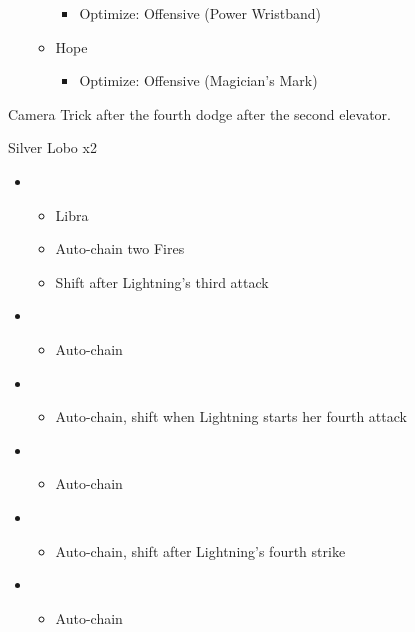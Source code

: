 \begin{multicols}{2}
\begin{menu}
\begin{itemize}
\begin{itemize}
	\begin{itemize}
		\item Optimize: Offensive (Power Wristband)
	\end{itemize}
        \item Hope
        \begin{itemize}
            \item Optimize: Offensive (Magician's Mark)
        \end{itemize}
    \end{itemize}
\end{itemize}
\end{menu}
Camera Trick after the fourth dodge after the second elevator.

\begin{battle}{Silver Lobo x2}
\begin{itemize}
    \item \first
    \begin{itemize}
        \item Libra
        \item Auto-chain two Fires
        \item Shift after Lightning's third attack
    \end{itemize}
    \item \fourth
    \begin{itemize}
        \item Auto-chain
    \end{itemize}
    \item \sixth
    \begin{itemize}
        \item Auto-chain, shift when Lightning starts her fourth attack
    \end{itemize}
    \item \first
    \begin{itemize}
        \item Auto-chain
    \end{itemize}
    \item \fourth
    \begin{itemize}
        \item Auto-chain, shift after Lightning's fourth strike
    \end{itemize}
    \item \sixth
    \begin{itemize}
        \item Auto-chain
    \end{itemize}
\end{itemize}
\end{battle}


\end{multicols}

